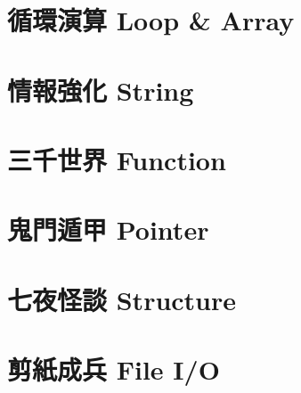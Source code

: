 \documentclass[12pt,a4paper]{book}
\begin{document}
\chapter{循環演算 Loop \& Array}

\chapter{情報強化 String}

\chapter{三千世界 Function}

\chapter{鬼門遁甲 Pointer}

\chapter{七夜怪談 Structure}

\chapter{剪紙成兵 File I/O}
\end{document}
